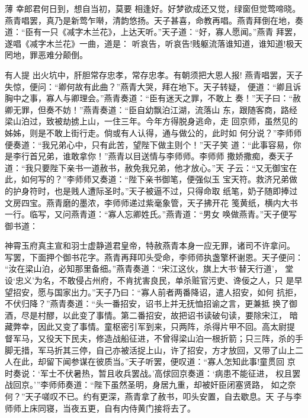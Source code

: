 薄
幸郎君何日到，想自当初，莫要
相逢好。好梦欲成还又觉，绿窗但觉莺啼晓。
燕青唱罢，真乃是新莺乍啭，清韵悠扬。天子甚喜，命教再唱。燕青拜倒在地，奏
道：“臣有一只《减字木兰花》，上达天听。”天子道：“好，寡人愿闻。”燕青
拜罢，遂唱《减字木兰花》一曲，道是：
听哀告，听哀告!贱躯流落谁知道，谁知道!极天罔地，罪恶难分颠倒。

有人提
出火坑中，肝胆常存忠孝，常存忠孝。有朝须把大恩人报!
燕青唱罢，天子失惊，便问：“卿何故有此曲？”燕青大哭，拜在地下。天子转疑，
便道：“卿且诉胸中之事，寡人与卿理会。”燕青奏道：“臣有迷天之罪，不敢上
奏！”天子曰：“赦卿无罪，但奏不妨！”燕青奏道：“臣自幼飘泊江湖，流落山
东，跟随客商，路经梁山泊过，致被劫掳上山，一住三年。今年方得脱身逃命，走
回京师，虽然见的姊姊，则是不敢上街行走。倘或有人认得，通与做公的，此时如
何分说？”李师师便奏道：“我兄弟心中，只有此苦，望陛下做主则个！”天子笑
道：“此事容易，你是李行首兄弟，谁敢拿你！”燕青以目送情与李师师。李师师
撒娇撒痴，奏天子道：“我只要陛下亲书一道赦书，赦免我兄弟，他才放心。”天
子云：“又无御宝在此，如何写的？”李师师又奏道：“陛下亲书御笔，便强似玉
宝天符。救济兄弟做的护身符时，也是贱人遭际圣时。”天子被逼不过，只得命取
纸笔，奶子随即捧过文房四宝。燕青磨的墨浓，李师师递过紫毫象管，天子拂开花
笺黄纸，横内大书一行。临写，又问燕青道：“寡人忘卿姓氏。”燕青道：“男女
唤做燕青。”天子便写御书道：

神霄玉府真主宣和羽士虚静道君皇帝，特赦燕青本身一应无罪，诸司不许拿问。
写罢，下面押个御书花字。燕青再拜叩头受命，李师师执盏擎杯谢恩。天子便问：
“汝在梁山泊，必知那里备细。”燕青奏道：“宋江这伙，旗上大书‘替天行道’，
堂设‘忠义’为名，不敢侵占州府，不肯扰害良民，单杀赃官污吏、谗佞之人，只
是早望招安，愿与国家出力。”天子乃曰：“寡人前者两番降诏，遣人招安，如何
抗拒，不伏归降？”燕青奏道：“头一番招安，诏书上并无抚恤招谕之言，更兼抵
换了御酒，尽是村醪，以此变了事情。第二番招安，故把诏书读破句读，要除宋江，
暗藏弊幸，因此又变了事情。童枢密引军到来，只两阵，杀得片甲不回。高太尉提
督军马，又役天下民夫，修造战船征进，不曾得梁山泊一根折箭；只三阵，杀的手
脚无措，军马折其三停，自己亦被活捉上山，许了招安，方才放回，又带了山上二
人在此，却留下闻参谋在彼质当。”天子听罢，便叹道：“寡人怎知此事!童贯回
京时奏说：‘军士不伏暑热，暂且收兵罢战。’高俅回京奏道：‘病患不能征进，
权且罢战回京。’”李师师奏道：“陛下虽然圣明，身居九重，却被奸臣闭塞贤路，
如之奈何？”天子嗟叹不已。约有更深，燕青拿了赦书，叩头安置，自去歇息。天
子与李师师上床同寝，当夜五更，自有内侍黄门接将去了。

